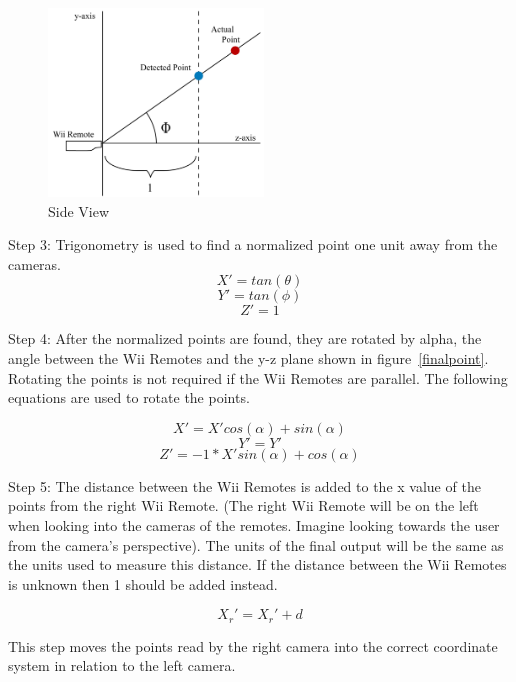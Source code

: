\documentclass[a4paper,twoside]{article}
\begin{document}
\begin{indenteddescription}
\begin{figure}[t] \begin{center} \includegraphics[height =
5cm]{Diagram2_CalcSideView.png} \end{center} \caption{Side View}
\label{sideview} \end{figure}

\item[Step 3:] Trigonometry is used to find a normalized point one unit away from
the cameras.  \begin{equation}\label{eq1} X' = tan(\theta) \end{equation}
\begin{equation}\label{eq2} Y' = tan(\phi)  \end{equation}
\begin{equation}\label{eq3} Z' = 1          \end{equation}

\item[Step 4:] After the normalized points are found, they are rotated by
alpha, the angle between the Wii Remotes and the y-z plane shown in
figure~\ref{finalpoint}. Rotating the points is not required if the Wii Remotes
are parallel. The following equations are used to rotate the points. 

\begin{flushleft} \begin{equation}\label{eq4} X' = X'cos(\alpha) + sin(\alpha)
\end{equation} \begin{equation}\label{eq5} Y' = Y'\end{equation}
\begin{equation}\label{eq6} Z' = -1 * X'sin(\alpha) + cos(\alpha)\end{equation}
\end{flushleft}


\item[Step 5:] The distance between the Wii Remotes is added to the x value of
the points from the right Wii Remote. (The right Wii Remote will be on the left
when looking into the cameras of the remotes. Imagine looking towards the user
from the camera's perspective). The units of the final output will be the same
as the units used to measure this distance. If the distance between the Wii
Remotes is unknown then 1 should be added instead.

\begin{equation}\label{eq7} X_{r}' = X_{r}' + d \end{equation}

This step moves the points read by the right camera into the correct coordinate
system in relation to the left camera.  \end{indenteddescription}
\end{document}
